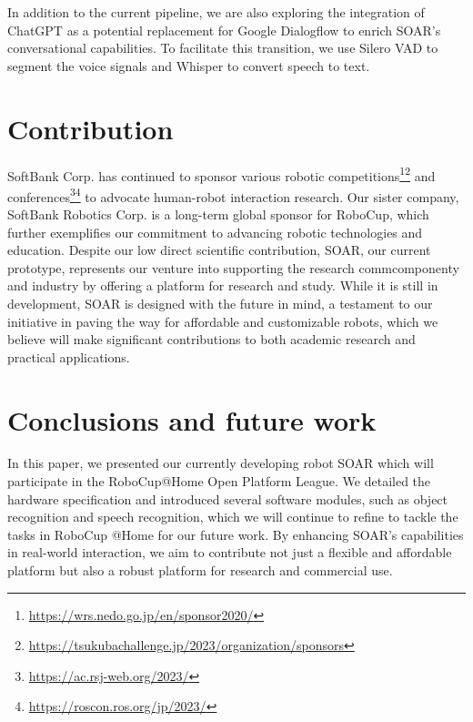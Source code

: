 \documentclass[runningheads,a4paper]{llncs}
\begin{document}
In addition to the current pipeline, we are also exploring the integration of ChatGPT\cite{openai2023gpt4} as a potential replacement for Google Dialogflow to enrich SOAR’s conversational capabilities.
To facilitate this transition, we use Silero VAD\cite{SileroVAD} to segment the voice signals and Whisper\cite{radford2022robust} to convert speech to text.


\section{Contribution}
SoftBank Corp. has continued to sponsor various robotic competitions\footnote{\url{https://wrs.nedo.go.jp/en/sponsor2020/}}\footnote{\url{https://tsukubachallenge.jp/2023/organization/sponsors}} and conferences\footnote{\url{https://ac.rsj-web.org/2023/}}\footnote{\url{https://roscon.ros.org/jp/2023/}} to advocate human-robot interaction research.
Our sister company, SoftBank Robotics Corp. is a long-term global sponsor for RoboCup, which further exemplifies our commitment to advancing robotic technologies and education.
Despite our low direct scientific contribution, SOAR, our current prototype, represents our venture into supporting the research commcomponenty and industry by offering a platform for research and study.
While it is still in development, SOAR is designed with the future in mind, a testament to our initiative in paving the way for affordable and customizable robots, which we believe will make significant contributions to both academic research and practical applications.

\section{Conclusions and future work}
In this paper, we presented our currently developing robot SOAR which will participate in the RoboCup@Home Open Platform League.
We detailed the hardware specification and introduced several software modules, such as object recognition and speech recognition, which we will continue to refine to tackle the tasks in RoboCup @Home for our future work.
By enhancing SOAR’s capabilities in real-world interaction, we aim to contribute not just a flexible and affordable platform but also a robust platform for research and commercial use.


%
%




\clearpage{}

%
%

\robospecs{}


\nocite{*}
\end{document}
